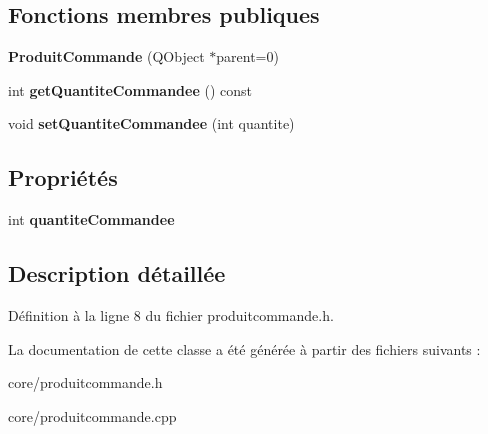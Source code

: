 \subsection*{Fonctions membres publiques}
\begin{DoxyCompactItemize}
\item 
\hypertarget{class_core_1_1_produit_commande_a58fd9cc89c8cf3dcaddf9817952a2042}{
{\bfseries ProduitCommande} (QObject $\ast$parent=0)}
\label{dc/d80/class_core_1_1_produit_commande_a58fd9cc89c8cf3dcaddf9817952a2042}

\item 
\hypertarget{class_core_1_1_produit_commande_ab829e7b286f4712346170605dc4d5dae}{
int {\bfseries getQuantiteCommandee} () const }
\label{dc/d80/class_core_1_1_produit_commande_ab829e7b286f4712346170605dc4d5dae}

\item 
\hypertarget{class_core_1_1_produit_commande_afcd2572b808302456a86ffc7f53ea537}{
void {\bfseries setQuantiteCommandee} (int quantite)}
\label{dc/d80/class_core_1_1_produit_commande_afcd2572b808302456a86ffc7f53ea537}

\end{DoxyCompactItemize}
\subsection*{Propriétés}
\begin{DoxyCompactItemize}
\item 
\hypertarget{class_core_1_1_produit_commande_a241e17ad0ed66194629c1533d52673aa}{
int {\bfseries quantiteCommandee}}
\label{dc/d80/class_core_1_1_produit_commande_a241e17ad0ed66194629c1533d52673aa}

\end{DoxyCompactItemize}


\subsection{Description détaillée}


Définition à la ligne 8 du fichier produitcommande.h.



La documentation de cette classe a été générée à partir des fichiers suivants :\begin{DoxyCompactItemize}
\item 
core/produitcommande.h\item 
core/produitcommande.cpp\end{DoxyCompactItemize}
